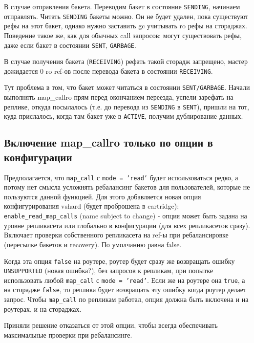 В случае отправления бакета. Переводим бакет в состояние \texttt{SENDING},
начинаем отправлять. Читать \texttt{SENDING} бакеты можно. Он не будет удален,
пока существуют рефы на этот бакет, однако нужно заставить gc учитывать ro рефы
на стораджах. Поведение такое же, как для обычных call запросов: могут
существовать рефы, даже если бакет в состоянии \texttt{SENT}, \texttt{GARBAGE}.

В случае получения бакета (\texttt{RECEIVING}) рефать такой сторадж запрещено,
мастер дожидается 0 ro ref-ов после перевода бакета в состоянии
\texttt{RECEIVING}.

Тут проблема в том, что бакет может читаться в состоянии \texttt{SENT/GARBAGE}.
Начали выполнять map\_callro прям перед окончанием переезда, успели зарефать на
реплике, откуда посылалось (т.е. до перевода из \texttt{SENDING} в
\texttt{SENT}), пришли на тот, куда прислалось, когда там бакет уже в
\texttt{ACTIVE}, получим дублирование данных.

\subsection*{Включение map_callro только по опции в конфигурации}

Предполагается, что \texttt{map_call} с \texttt{mode = 'read'} будет
использоваться редко, а потому нет смысла усложнять ребалансинг бакетов для
пользователей, которые не пользуются данной функцией. Для этого добавляется
новая опция конфигурирования vshard (будет проброшена в cartridge):
\texttt{enable_read_map_calls} (name subject to change) - опция может быть
задана на уровне репликасета или глобально в конфигурации (для всех
репликасетов сразу). Включает проверки собственного репликасета на ref-ы при
ребалансировке (пересылке бакетов и recovery). По умолчанию равна false.

Когда эта опция \texttt{false} на роутере, роутер будет сразу же возвращать
ошибку \texttt{UNSUPPORTED} (новая ошибка?), без запросов к репликам, при
попытке использовать любой \texttt{map_call} с \texttt{mode = 'read'}. Если же
на роутере она \texttt{true}, а на сторадже \texttt{false}, то реплика будет
возвращать эту ошибку когда роутер делает запрос. Чтобы \texttt{map_call} по
репликам работал, опция должна быть включена и на роутерах, и на стораджах.

Приняли решение отказаться от этой опции, чтобы всегда обеспечивать
максимальные проверки при ребалансинге.
